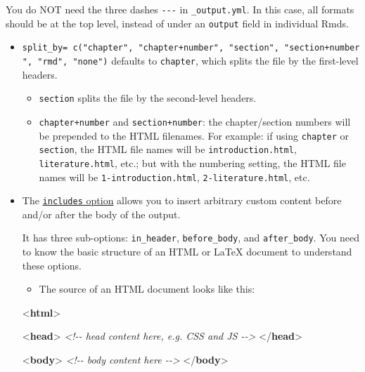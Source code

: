 \documentclass[
  a4paper,
  twoside,
  openright]{book}
\newenvironment{Shaded}{\begin{snugshade}}{\end{snugshade}}
\newcommand{\CommentTok}[1]{\textcolor[rgb]{0.56,0.35,0.01}{\textit{#1}}}
\newcommand{\DataTypeTok}[1]{\textcolor[rgb]{0.13,0.29,0.53}{#1}}
\newcommand{\KeywordTok}[1]{\textcolor[rgb]{0.13,0.29,0.53}{\textbf{#1}}}
\providecommand{\tightlist}{%
  \setlength{\itemsep}{0pt}\setlength{\parskip}{0pt}}
\theoremstyle{definition}
\theoremstyle{definition}
\theoremstyle{definition}
\theoremstyle{definition}
\theoremstyle{remark}
\begin{document}
You do NOT need the three dashes \texttt{-\/-\/-} in \texttt{\_output.yml}. In this case, all formats should be at the top level, instead of under an \texttt{output} field in individual Rmds.

\begin{itemize}
\item
  \texttt{split\_by=\ c("chapter",\ "chapter+number",\ "section",\ "section+number",\ "rmd",\ "none")} defaults to \texttt{chapter}, which splits the file by the first-level headers.

  \begin{itemize}
  \tightlist
  \item
    \texttt{section} splits the file by the second-level headers.
  \item
    \texttt{chapter+number} and \texttt{section+number}: the chapter/section numbers will be prepended to the HTML filenames. For example: if using \texttt{chapter} or \texttt{section}, the HTML file names will be \texttt{introduction.html}, \texttt{literature.html}, etc.; but with the numbering setting, the HTML file names will be \texttt{1-introduction.html}, \texttt{2-literature.html}, etc.
  \end{itemize}
\item
  The \href{https://bookdown.org/yihui/bookdown/yaml-options.html}{\texttt{includes} option} allows you to insert arbitrary custom content before and/or after the body of the output.

  It has three sub-options: \texttt{in\_header}, \texttt{before\_body}, and \texttt{after\_body}. You need to know the basic structure of an HTML or LaTeX document to understand these options.

  \begin{itemize}
  \tightlist
  \item
    The source of an HTML document looks like this:
  \end{itemize}

\begin{Shaded}
\begin{Highlighting}[]
\DataTypeTok{\textless{}}\KeywordTok{html}\DataTypeTok{\textgreater{}}

  \DataTypeTok{\textless{}}\KeywordTok{head}\DataTypeTok{\textgreater{}}
  \CommentTok{\textless{}!{-}{-} head content here, e.g. CSS and JS {-}{-}\textgreater{}}
  \DataTypeTok{\textless{}/}\KeywordTok{head}\DataTypeTok{\textgreater{}}

  \DataTypeTok{\textless{}}\KeywordTok{body}\DataTypeTok{\textgreater{}}
  \CommentTok{\textless{}!{-}{-} body content here {-}{-}\textgreater{}}
  \DataTypeTok{\textless{}/}\KeywordTok{body}\DataTypeTok{\textgreater{}}


\end{Highlighting}
\end{Shaded}
\end{itemize}
\end{document}
